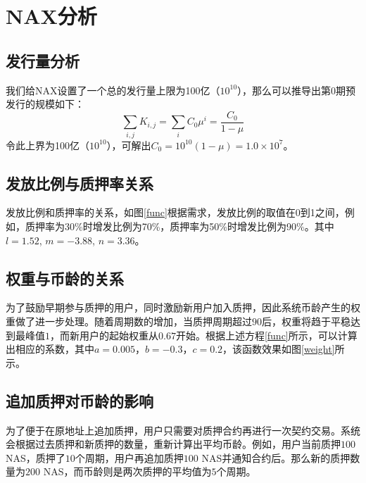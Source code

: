 \section{NAX分析}
\subsection{发行量分析}
我们给NAX设置了一个总的发行量上限为100亿（\(10^{10}\)），那么可以推导出第0期预发行的规模如下：
\begin{equation}
  \sum_{i,j} K_{i,j} = \sum_i C_0 \mu^i = \frac{C_0}{1-\mu}
\end{equation}
  令此上界为100亿（\(10^{10}\)），可解出\(C_0 = 10^{10}(1-\mu) = 1.0\times10^7\)。

\subsection{发放比例与质押率关系}
发放比例和质押率的关系，如图\ref{func}根据需求，发放比例的取值在0到1之间，例如，质押率为30\%时增发比例为70\%，质押率为50\%时增发比例为90\%。其中\(l=1.52\), \(m=-3.88\), \(n=3.36\)。

\subsection{权重与币龄的关系}
为了鼓励早期参与质押的用户，同时激励新用户加入质押，因此系统币龄产生的权重做了进一步处理。随着周期数的增加，当质押周期超过$90$后，权重将趋于平稳达到最峰值$1$，而新用户的起始权重从$0.67$开始。根据上述方程\ref{func}所示，可以计算出相应的系数，其中\(a=0.005\)，\(b=-0.3\)，\(c=0.2\)，该函数效果如图\ref{weight}所示。

\subsection{追加质押对币龄的影响}
为了便于在原地址上追加质押，用户只需要对质押合约再进行一次契约交易。系统会根据过去质押和新质押的数量，重新计算出平均币龄。例如，用户当前质押$100$NAS，质押了$10$个周期，用户再追加质押$100$ NAS并通知合约后。那么新的质押数量为$200$ NAS，而币龄则是两次质押的平均值为$5$个周期。

